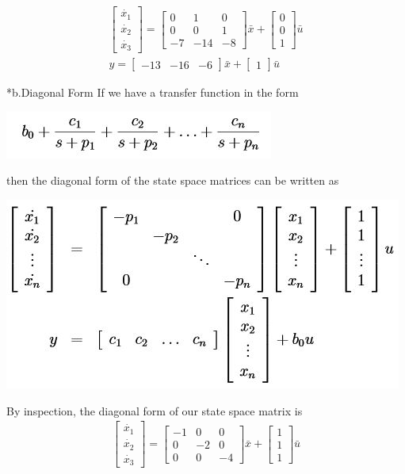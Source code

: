 \documentclass[paper=a4, fontsize=11pt]{scrartcl} %
\numberwithin{equation}{section} %
\numberwithin{figure}{section} %
\numberwithin{table}{section} %
\begin{document}
\begin{section}
\begin{subsection}
\begin{align*}
\begin{bmatrix}\dot{x_1}\\\dot{x_2}\\\dot{x_3}\end{bmatrix}=\begin{bmatrix}0 & 1 & 0\\0 & 0 & 1\\-7 & -14 & -8\end{bmatrix}\bar{x}+\begin{bmatrix}0\\0\\1\end{bmatrix}\bar{u}\\
y=\begin{bmatrix}
-13 & -16 & -6 \end{bmatrix}\bar{x} + \begin{bmatrix}1\end{bmatrix}\bar{u}
\end{align*}
\end{subsection}
\begin{subsection}*{b.Diagonal Form}
If we have a transfer function in the form
\begin{center}
\includegraphics{Image4}
\end{center}
then the diagonal form of the state space matrices can be written as 
\begin{center}
\includegraphics{Image5}
\end{center}
By inspection, the diagonal form of our state space matrix is 
\begin{align*}
\begin{bmatrix}\dot{x_1}\\\dot{x_2}\\\dot{x_3}\end{bmatrix}=\begin{bmatrix}-1 & 0 & 0\\0 & -2 & 0\\0 & 0 & -4\end{bmatrix}\bar{x}+\begin{bmatrix}1\\1\\1\end{bmatrix}\bar{u}\\

\end{align*}
\end{subsection}
\end{section}
\end{document}
